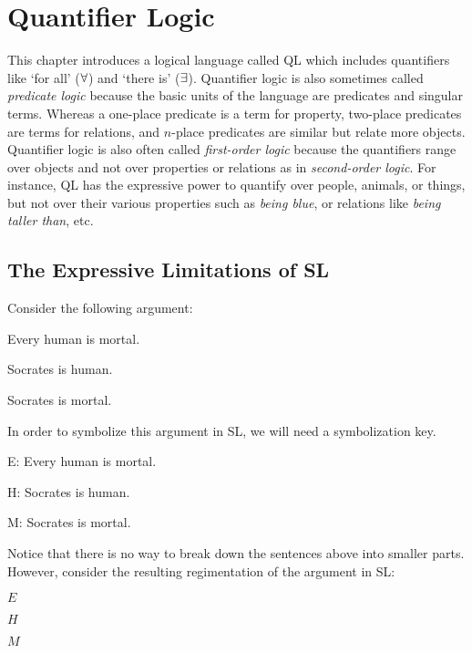 \chapter{Quantifier Logic}
\label{ch.QL}

This chapter introduces a logical language called QL which includes quantifiers like `for all' ($\forall$) and `there is' ($\exists$).
Quantifier logic is also sometimes called \emph{predicate logic} because the basic units of the language are predicates and singular terms.
Whereas a one-place predicate is a term for property, two-place predicates are terms for relations, and $n$-place predicates are similar but relate more objects.
Quantifier logic is also often called \textit{first-order logic} because the quantifiers range over objects and not over properties or relations as in \textit{second-order logic}.
For instance, QL has the expressive power to quantify over people, animals, or things, but not over their various properties such as \textit{being blue}, or relations like \textit{being taller than}, etc.




\section{The Expressive Limitations of SL}

Consider the following argument:

\begin{earg}
  \item[] Every human is mortal.
  \item[] Socrates is human.
  \item[\therefore] Socrates is mortal.
\end{earg}

In order to symbolize this argument in SL, we will need a symbolization key. 

\begin{ekey}
  \item[E:] Every human is mortal.
  \item[H:] Socrates is human.
  \item[M:] Socrates is mortal.
\end{ekey}

Notice that there is no way to break down the sentences above into smaller parts.
However, consider the resulting regimentation of the argument in SL:

\begin{earg}
  \item[] $E$
  \item[] $H$
  \item[\therefore] $M$
\end{earg}

